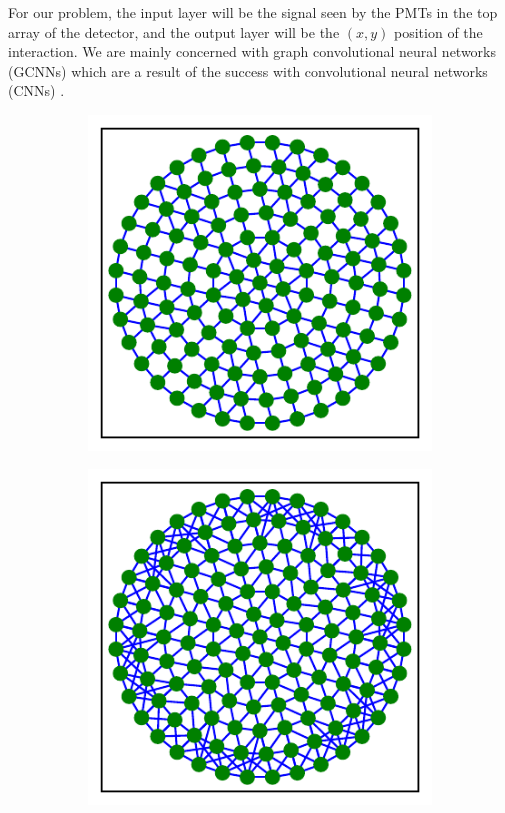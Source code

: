 \documentclass[thesis.tex]{subfiles}
\begin{document}
\par For our problem, the input layer will be the signal seen by the PMTs in the top array of the detector, and the output layer will be the $(x,y)$ position of the interaction.
We are mainly concerned with graph convolutional neural networks (GCNNs) which are a result of the success with convolutional neural networks (CNNs) \cite{GCNN_Kipf}.
\begin{figure}[t]
	\centering
	\begin{subfigure}{0.32\textwidth}
		\includegraphics[width=\textwidth]{figures/1T_radius-graph_R10.pdf}
		\caption{}
	\end{subfigure}
	\begin{subfigure}{0.32\textwidth}
		\includegraphics[width=\textwidth]{figures/1T_kNN-graph_k6.pdf}

\end{subfigure}
\end{figure}
\end{document}
